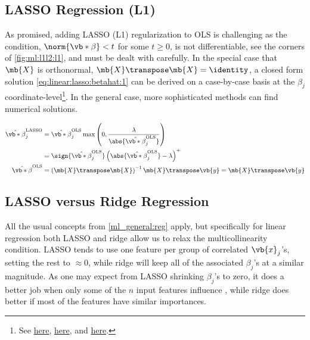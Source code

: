 \subsection{LASSO Regression (L1)}
\label{regression:linear:lasso}

As promised, adding LASSO (L1) regularization to OLS is challenging
as the condition, $\norm{\vb*{\beta}} < t$ for some $t \geq 0$,
is not differentiable, see the corners of \cref{fig:ml:l1l2:l1}, and must be dealt with carefully.
In the special case that $\mb{X}$ is orthonormal, $\mb{X}\transpose \mb{X} = \identity$,
a closed form solution \cref{eq:linear:lasso:betahat:1} can be derived on a case-by-case basis
at the $\beta_{j}$ coordinate-level\footnote{See \href{https://stats.stackexchange.com/questions/17781/derivation-of-closed-form-lasso-solution}{here},
\href{https://en.wikipedia.org/wiki/Lasso_(statistics)\#Orthonormal_covariates}{here},
and \href{https://xavierbourretsicotte.github.io/lasso_derivation.html}{here}.}.
In the general case, more sophisticated methods can find numerical solutions.

\begin{subequations} \label{eq:linear:lasso:betahat_all}
\begin{align}
\hat{\vb*{\beta}}^{\text{LASSO}}_{j}
&= \hat{\vb*{\beta}}^{\text{OLS}}_{j} \max\left(0, \frac{\lambda}{\abs{\hat{\vb*{\beta}}^{\text{OLS}}_{j}}}\right) \label{eq:linear:lasso:betahat:1} \\
&= \sign{\hat{\vb*{\beta}}^{\text{OLS}}_{j}} \left(\abs{\hat{\vb*{\beta}}^{\text{OLS}}_{j}} - \lambda\right)^{+} \label{eq:linear:lasso:betahat:2} \\
\hat{\vb*{\beta}}^{\text{OLS}}
&= \left(\mb{X}\transpose\mb{X}\right)^{-1}\mb{X}\transpose \vb{y}
= \mb{X}\transpose \vb{y} \label{eq:lasso:modified_betahat_OLS}
\end{align}
\end{subequations}

\subsection{LASSO versus Ridge Regression}
\label{regression:linear:lasso_vs_ridge}

All the usual concepts from \cref{ml_general:reg} apply, but specifically for linear regression
both LASSO and ridge allow us to relax the multicollinearity condition.
LASSO tends to use one feature per group of correlated $\vb{x}_{j}$'s, setting the rest to $\approx 0$,
while ridge will keep all of the associated $\beta_{j}$'s at a similar magnitude.
As one may expect from LASSO shrinking $\beta_{j}$'s to zero,
it does a better job when only some of the $n$ input features influence \yhat,
while ridge does better if most of the features have similar importances.

